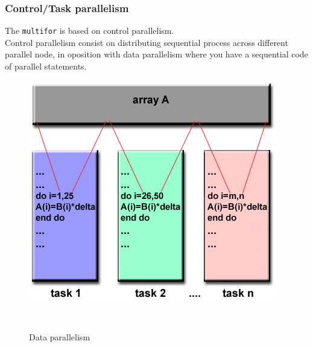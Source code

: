\documentclass{beamer}
\begin{document}
\begin{frame}
\frametitle{Control/Task parallelism}

The \texttt{multifor} is based on control parallelism. \\
        Control parallelism consist on distributing sequential process across different parallel node, in oposition with data parallelism where you have a sequential code of parallel statements.

        \begin{figure}[h!]

        \centering
        \begin{minipage}[t]{0.40\textwidth}

        \centering
        \includegraphics[width=\textwidth]{pictures/data-parallelism}
        \caption{Data parallelism}

        \end{minipage}~%
        \begin{minipage}[t]{0.40\textwidth}


\end{minipage}
\end{figure}
\end{frame}
\end{document}
